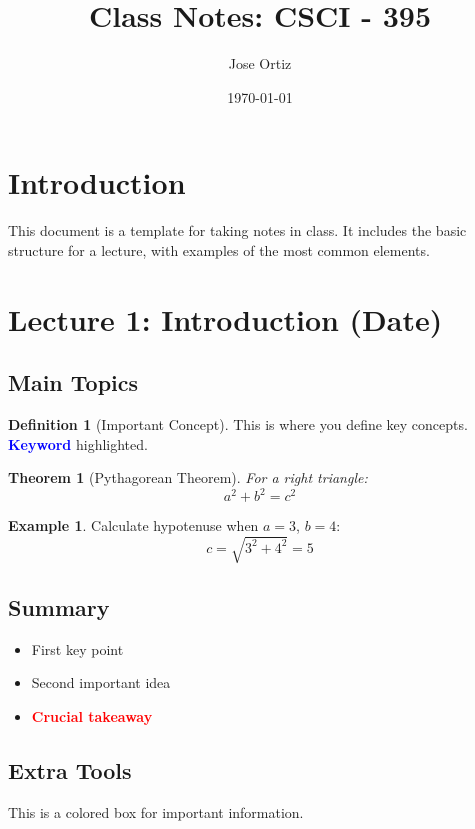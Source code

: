 \documentclass[11pt]{article}
\theoremstyle{definition}
\newtheorem{definition}{Definition}[section]
\newtheorem{example}{Example}[section]
\theoremstyle{plain}
\newtheorem{theorem}{Theorem}[section]
\newcommand{\important}[1]{\textcolor{red}{\textbf{#1}}}
\newcommand{\todo}[1]{\marginpar{\textcolor{red}{TODO: #1}}}
\newcommand{\keyterm}[1]{\textbf{\textcolor{blue}{#1}}}
\begin{document}
\title{Class Notes: CSCI - 395}
\author{Jose Ortiz}
\date{\today}
\maketitle
\tableofcontents
\newpage

\section{Introduction}
This document is a template for taking notes in class. It includes the basic structure for a lecture, with examples of the most common elements.







\newpage

\section{Lecture 1: Introduction (Date)}
\subsection{Main Topics}

\begin{definition}[Important Concept]
This is where you define key concepts. \keyterm{Keyword} highlighted.
\end{definition}

\begin{theorem}[Pythagorean Theorem]
For a right triangle:
\begin{equation}
a^2 + b^2 = c^2
\end{equation}
\end{theorem}


\begin{example}
Calculate hypotenuse when $a=3$, $b=4$:
\begin{equation*}
c = \sqrt{3^2 + 4^2} = 5
\end{equation*}
\end{example}

\subsection{Summary}
\begin{itemize}
\item First key point \todo{Add reference}
\item Second important idea
\item \important{Crucial takeaway}
\end{itemize}

\subsection{Extra Tools}
\begin{tcolorbox}[title=Quick Reference,colback=blue!5!white,colframe=blue!75!black]
This is a colored box for important information.
\end{tcolorbox}
\end{document}
